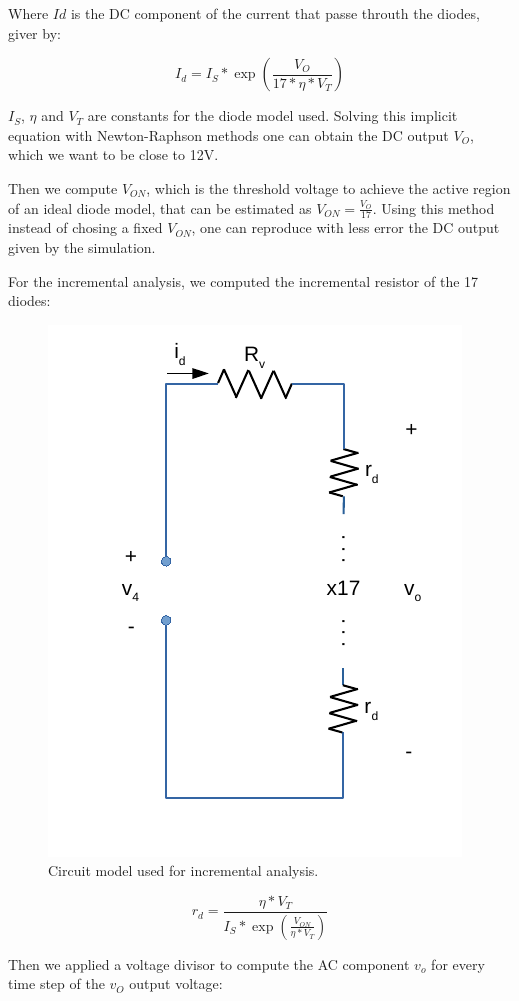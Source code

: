  \par Where $Id$ is the DC component of the current that passe throuth the diodes, giver by:
 
\begin{equation}
I_d=I_S*\exp{(\frac{V_O}{17*\eta*V_T})}
\label{eq:Id}
\end{equation}
 
 \par $I_S$, $\eta$ and $V_T$ are constants for the diode model used. Solving this implicit equation with Newton-Raphson methods one can obtain the DC output $V_O$, which we want to be close to 12V.  
 \par Then we compute $V_{ON}$, which is the threshold voltage to achieve the active region of an ideal diode model, that can be estimated as $V_{ON}=\frac{V_O}{17}$. Using this method instead of chosing a fixed $V_{ON}$, one can reproduce with less error the DC output given by the simulation.
 
 \par For the incremental analysis, we computed the incremental resistor of the 17 diodes:
 
\begin{figure}[H] \centering
\includegraphics[width=0.5 \linewidth]{volt_regulator.pdf}
\caption{Circuit model used for incremental analysis.}
\label{fig:env}
\end{figure}
 
\begin{equation}
r_d=\frac{\eta*V_T}{I_S*\exp{(\frac{V_{ON}}{\eta*V_T})}}
\label{eq:rd}
\end{equation}

\par Then we applied a voltage divisor to compute the AC component $v_o$ for every time step of the $v_O$ output voltage:

